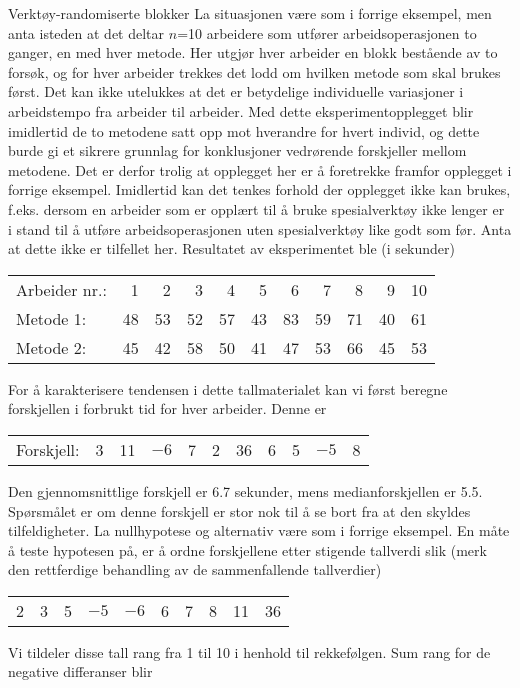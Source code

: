 \begin{eksempel}{Verktøy-randomiserte blokker}
La situasjonen være som i forrige eksempel, men anta isteden at 
det deltar $n$=10 arbeidere som utfører arbeidsoperasjonen to
ganger, en med hver metode.  Her utgjør hver arbeider en blokk 
bestående av to forsøk, og for hver arbeider trekkes det lodd
om hvilken metode som skal brukes først.  Det kan ikke utelukkes
at det er betydelige individuelle variasjoner i arbeidstempo fra arbeider
til arbeider.  Med dette eksperimentopplegget blir imidlertid de to
metodene satt opp mot hverandre for hvert individ, og dette burde gi et
sikrere grunnlag for konklusjoner vedrørende forskjeller mellom
metodene.  Det er derfor trolig at opplegget her er å foretrekke 
framfor opplegget i forrige eksempel.  Imidlertid kan det tenkes forhold
der opplegget ikke kan brukes, f.eks. dersom en arbeider som er opplært
til å bruke spesialverktøy ikke lenger er i stand til å 
utføre arbeidsoperasjonen uten spesialverktøy like godt som før.
Anta at dette ikke er tilfellet her.  Resultatet av eksperimentet ble
(i sekunder)
\begin{center}
\begin{tabular}{lrrrrrrrrrr}
Arbeider nr.: &   1  &  2  &  3  &  4  &  5  &  6  &  7  &  8  &  9  &  10 \\
Metode 1:    &  48  & 53  & 52  & 57  & 43  & 83  & 59  & 71  & 40  &  61 \\
Metode 2:    &  45  & 42  & 58  & 50  & 41  & 47  & 53  & 66  & 45  &  53
\end{tabular}
\end{center}
For å karakterisere tendensen i dette tallmaterialet kan vi først
beregne forskjellen i forbrukt tid for hver arbeider.  Denne er
\begin{center}
\begin{tabular}{lrrrrrrrrrr}
Forskjell: &   3  &  11  &  $-6$  &  7  &  2  &  36  &  6  &  5  &  $-5$  &  8
\end{tabular}
\end{center}
Den gjennomsnittlige forskjell er 6.7 sekunder, mens medianforskjellen
er 5.5.  Spørsmålet er om denne forskjell er stor nok til å
se bort fra at den skyldes tilfeldigheter.  La nullhypotese og 
alternativ være som i forrige eksempel.  En måte å teste
hypotesen på, er å ordne forskjellene etter stigende tallverdi
slik (merk den rettferdige behandling av de sammenfallende tall\-ver\-dier)
\begin{center}
\begin{tabular}{cccccccccc}
           2  &  3  &  5  &  $-5$  &  $-6$  &  6  &  7  &  8  &  11  &  36
\end{tabular}
\end{center}
Vi tildeler disse tall rang fra 1 til 10 i henhold til rekkefølgen.
Sum rang for de negative differanser blir


\end{eksempel}
